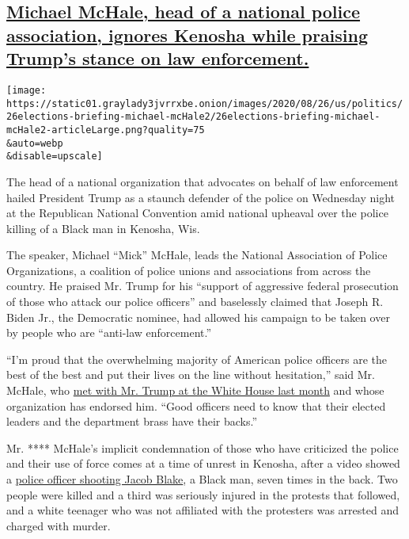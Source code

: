 \hypertarget{michael-mchale-head-of-a-national-police-association-ignores-kenosha-while-praising-trumps-stance-on-law-enforcement}{%
\subsection{\texorpdfstring{\protect\hyperlink{michael-mchale-head-of-a-national-police-association-ignores-kenosha-while-praising-trumps-stance-on-law-enforcement}{Michael
McHale, head of a national police association, ignores Kenosha while
praising Trump's stance on law
enforcement.}}{Michael McHale, head of a national police association, ignores Kenosha while praising Trump's stance on law enforcement.}}\label{michael-mchale-head-of-a-national-police-association-ignores-kenosha-while-praising-trumps-stance-on-law-enforcement}}

\texttt{[image: https://static01.graylady3jvrrxbe.onion/images/2020/08/26/us/politics/26elections-briefing-michael-mcHale2/26elections-briefing-michael-mcHale2-articleLarge.png?quality=75\\\&auto=webp\\\&disable=upscale]}

The head of a national organization that advocates on behalf of law
enforcement hailed President Trump as a staunch defender of the police
on Wednesday night at the Republican National Convention amid national
upheaval over the police killing of a Black man in Kenosha, Wis.

The speaker, Michael ``Mick'' McHale, leads the National Association of
Police Organizations, a coalition of police unions and associations from
across the country. He praised Mr. Trump for his ``support of aggressive
federal prosecution of those who attack our police officers'' and
baselessly claimed that Joseph R. Biden Jr., the Democratic nominee, had
allowed his campaign to be taken over by people who are ``anti-law
enforcement.''

``I'm proud that the overwhelming majority of American police officers
are the best of the best and put their lives on the line without
hesitation,'' said Mr. McHale, who
\href{https://www.whitehouse.gov/briefings-statements/remarks-president-trump-meeting-national-association-police-organizations-leadership/}{met
with Mr. Trump at the White House last month} and whose organization has
endorsed him. ``Good officers need to know that their elected leaders
and the department brass have their backs.''

Mr. **** McHale's implicit condemnation of those who have criticized the
police and their use of force comes at a time of unrest in Kenosha,
after a video showed a
\href{https://www.nytimes3xbfgragh.onion/2020/08/24/us/kenosha-police-shooting.html}{police
officer shooting Jacob Blake}, a Black man, seven times in the back. Two
people were killed and a third was seriously injured in the protests
that followed, and a white teenager who was not affiliated with the
protesters was arrested and charged with murder.

